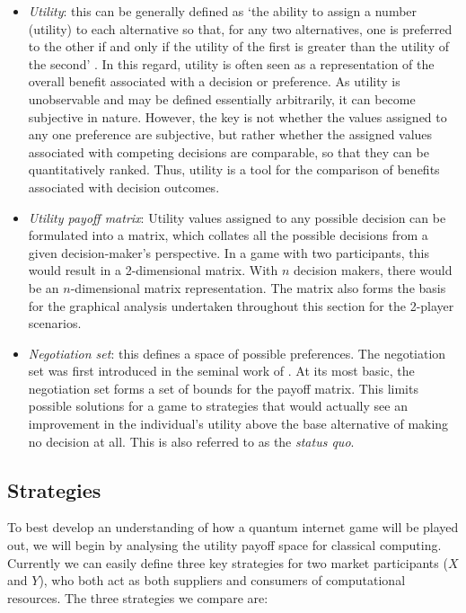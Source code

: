 \begin{itemize}
	\item \textit{Utility}: this can be generally defined as `the ability to assign a number (utility) to each alternative so that, for any two alternatives, one is preferred to the other if and only if the utility of the first is greater than the utility of the second' \cite{bib:Fishburn70}. In this regard, utility is often seen as a representation of the overall benefit associated with a decision or preference. As utility is unobservable and may be defined essentially arbitrarily, it can become subjective in nature. However, the key is not whether the values assigned to any one preference are subjective, but rather whether the assigned values associated with competing decisions are comparable, so that they can be quantitatively ranked. Thus, utility is a tool for the comparison of benefits associated with decision outcomes.

	\item \textit{Utility payoff matrix}: Utility values assigned to any possible decision can be formulated into a matrix, which collates all the possible decisions from a given decision-maker's perspective. In a game with two participants, this would result in a 2-dimensional matrix. With $n$ decision makers, there would be an $n$-dimensional matrix representation. The matrix also forms the basis for the graphical analysis undertaken throughout this section for the 2-player scenarios.

	\item \textit{Negotiation set}: this defines a space of possible preferences. The negotiation set was first introduced in the seminal work of \cite{bib:NeumanMorgenstern44}. At its most basic, the negotiation set forms a set of bounds for the payoff matrix. This limits possible solutions for a game to strategies that would actually see an improvement in the individual's utility above the base alternative of making no decision at all. This is also referred to as the \textit{status quo}.
\end{itemize}

\subsection{Strategies}

To best develop an understanding of how a quantum internet game will be played out, we will begin by analysing the utility payoff space for classical computing. Currently we can easily define three key strategies for two market participants ($X$ and $Y$), who both act as both suppliers and consumers of computational resources. The three strategies we compare are:

